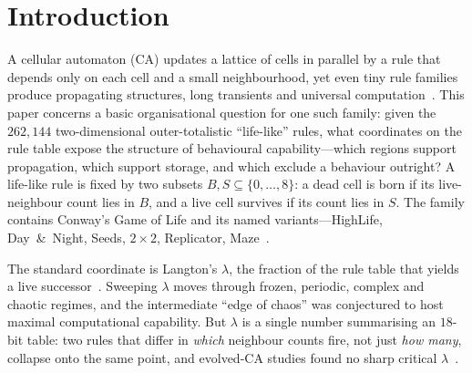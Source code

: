 \documentclass{article}
\begin{document}
\begin{abstract}
recurrence. Two dynamical results frame the whole: rules that support a glider yet
rarely or never produce one under random sampling show that capability is
\emph{certifiable} from the table but its expression only \emph{estimable} from
dynamics; and, conversely, of the uncatalogued rules whose dynamics we screen for
a Game-of-Life--like object ecology, those matching it richly are all Conway or
HighLife variants differing only on neighbour counts their trajectories never
visit---so table difference need not mean behavioural difference. The coordinates
organise the family not by certifying capability but by carving the regions where
it is possible---and, on the fully totalistic submanifold, the region where it is
impossible.
\end{abstract}

\section{Introduction}

A cellular automaton (CA) updates a lattice of cells in parallel by a rule that
depends only on each cell and a small neighbourhood, yet even tiny rule families
produce propagating structures, long transients and universal
computation~\cite{vonneumann1966,wolfram1983,berlekamp1982}. This paper concerns
a basic organisational question for one such family: given the $262{,}144$
two-dimensional outer-totalistic ``life-like'' rules, what coordinates on the
rule table expose the structure of behavioural capability---which regions support
propagation, which support storage, and which exclude a behaviour outright? A
life-like rule
is fixed by two subsets $B,S\subseteq\{0,\dots,8\}$: a dead cell is born if its
live-neighbour count lies in $B$, and a live cell survives if its count lies in
$S$. The family contains Conway's Game of Life and its named variants---HighLife,
Day~\&~Night, Seeds, $2{\times}2$, Replicator,
Maze~\cite{gardner1970,adamatzky2010,eppstein2010}.

The standard coordinate is Langton's $\lambda$, the fraction of the rule table
that yields a live successor~\cite{langton1990}. Sweeping $\lambda$ moves through
frozen, periodic, complex and chaotic regimes, and the intermediate ``edge of
chaos'' was conjectured to host maximal computational capability. But $\lambda$
is a single number summarising an $18$-bit table: two rules that differ in
\emph{which} neighbour counts fire, not just \emph{how many}, collapse onto the
same point, and evolved-CA studies found no sharp critical
$\lambda$~\cite{mitchell1993}.
\end{document}
